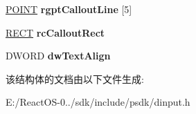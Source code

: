 \begin{DoxyCompactItemize}
\hyperlink{structtag_p_o_i_n_t}{P\+O\+I\+NT} {\bfseries rgpt\+Callout\+Line} \mbox{[}5\mbox{]}
\item 
\mbox{\label{struct___d_i_d_e_v_i_c_e_i_m_a_g_e_i_n_f_o_a_a5c9c7745ec2595925f35ece017eb150f}} 
\hyperlink{structtag_r_e_c_t}{R\+E\+CT} {\bfseries rc\+Callout\+Rect}
\item 
\mbox{\label{struct___d_i_d_e_v_i_c_e_i_m_a_g_e_i_n_f_o_a_a2e2cccf84cdb572c322383a5963effae}} 
D\+W\+O\+RD {\bfseries dw\+Text\+Align}
\end{DoxyCompactItemize}


该结构体的文档由以下文件生成\+:\begin{DoxyCompactItemize}
\item 
E\+:/\+React\+O\+S-\/0../sdk/include/psdk/dinput.\+h\end{DoxyCompactItemize}
